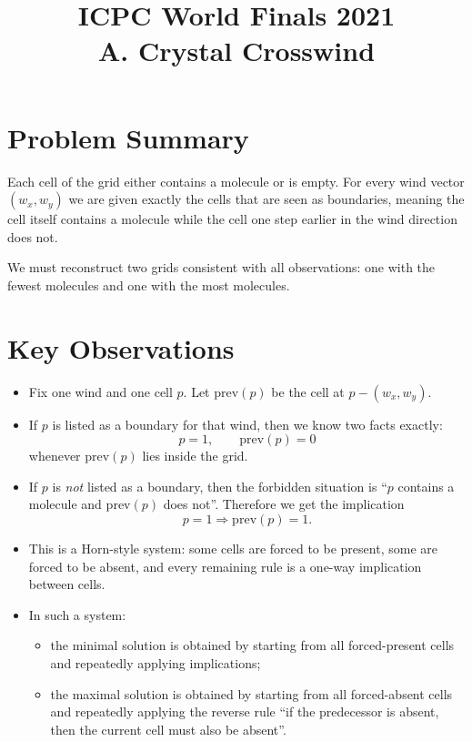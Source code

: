 \documentclass[11pt]{article}
\title{ICPC World Finals 2021\\A. Crystal Crosswind}
\author{}
\date{}
\begin{document}
\maketitle

\section*{Problem Summary}

Each cell of the grid either contains a molecule or is empty. For every wind vector $(w_x, w_y)$ we are
given exactly the cells that are seen as boundaries, meaning the cell itself contains a molecule while the
cell one step earlier in the wind direction does not.

We must reconstruct two grids consistent with all observations: one with the fewest molecules and one
with the most molecules.

\section*{Key Observations}

\begin{itemize}[leftmargin=*]
    \item Fix one wind and one cell $p$. Let $\mathrm{prev}(p)$ be the cell at $p-(w_x, w_y)$.
    \item If $p$ is listed as a boundary for that wind, then we know two facts exactly:
    \[
        p = 1,\qquad \mathrm{prev}(p) = 0
    \]
    whenever $\mathrm{prev}(p)$ lies inside the grid.
    \item If $p$ is \emph{not} listed as a boundary, then the forbidden situation is ``$p$ contains a molecule
    and $\mathrm{prev}(p)$ does not''. Therefore we get the implication
    \[
        p = 1 \Longrightarrow \mathrm{prev}(p) = 1.
    \]
    \item This is a Horn-style system: some cells are forced to be present, some are forced to be absent,
    and every remaining rule is a one-way implication between cells.
    \item In such a system:
    \begin{itemize}[leftmargin=*]
        \item the minimal solution is obtained by starting from all forced-present cells and repeatedly applying
        implications;
        \item the maximal solution is obtained by starting from all forced-absent cells and repeatedly applying
        the reverse rule ``if the predecessor is absent, then the current cell must also be absent''.
    \end{itemize}
\end{itemize}
\end{document}
